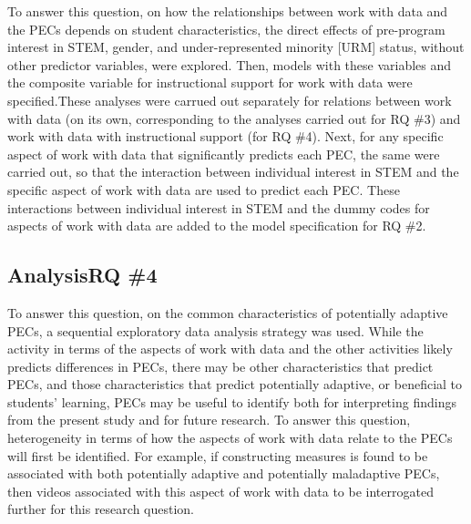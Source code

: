 \documentclass[]{msu-thesis}
\theoremstyle{definition}
\theoremstyle{definition}
\theoremstyle{definition}
\theoremstyle{remark}
\begin{document}
To answer this question, on how the relationships between work with data
and the PECs depends on student characteristics, the direct effects of
pre-program interest in STEM, gender, and under-represented minority
{[}URM{]} status, without other predictor variables, were explored.
Then, models with these variables and the composite variable for
instructional support for work with data were specified.These analyses
were carrued out separately for relations between work with data (on its
own, corresponding to the analyses carried out for RQ \#3) and work with
data with instructional support (for RQ \#4). Next, for any specific
aspect of work with data that significantly predicts each PEC, the same
were carried out, so that the interaction between individual interest in
STEM and the specific aspect of work with data are used to predict each
PEC. These interactions between individual interest in STEM and the
dummy codes for aspects of work with data are added to the model
specification for RQ \#2.

\subsection{AnalysisRQ \#4}\label{analysisrq-4}

To answer this question, on the common characteristics of potentially
adaptive PECs, a sequential exploratory data analysis strategy was used.
While the activity in terms of the aspects of work with data and the
other activities likely predicts differences in PECs, there may be other
characteristics that predict PECs, and those characteristics that
predict potentially adaptive, or beneficial to students' learning, PECs
may be useful to identify both for interpreting findings from the
present study and for future research. To answer this question,
heterogeneity in terms of how the aspects of work with data relate to
the PECs will first be identified. For example, if constructing measures
is found to be associated with both potentially adaptive and potentially
maladaptive PECs, then videos associated with this aspect of work with
data to be interrogated further for this research question.
\end{document}
